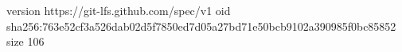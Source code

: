 version https://git-lfs.github.com/spec/v1
oid sha256:763e52cf3a526dab02d5f7850ed7d05a27bd71e50bcb9102a390985f0bc85852
size 106
